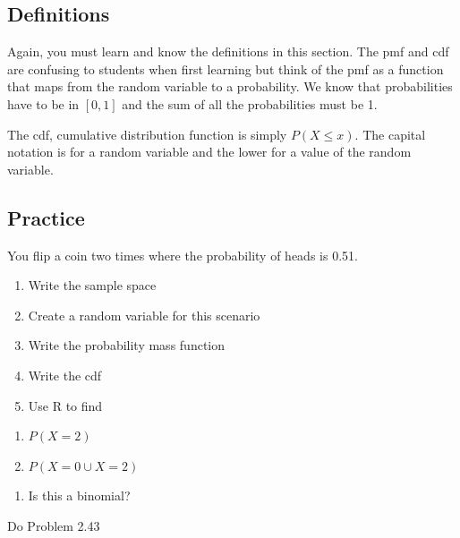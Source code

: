 \documentclass[]{book}
\providecommand{\tightlist}{%
  \setlength{\itemsep}{0pt}\setlength{\parskip}{0pt}}
\theoremstyle{definition}
\theoremstyle{definition}
\theoremstyle{definition}
\theoremstyle{remark}
\begin{document}
\subsection{Definitions}\label{definitions-1}

Again, you must learn and know the definitions in this section. The pmf
and cdf are confusing to students when first learning but think of the
pmf as a function that maps from the random variable to a probability.
We know that probabilities have to be in \([0,1]\) and the sum of all
the probabilities must be 1.

The cdf, cumulative distribution function is simply \(P(X \leq x)\). The
capital notation is for a random variable and the lower for a value of
the random variable.

\subsection{Practice}\label{practice}

You flip a coin two times where the probability of heads is 0.51.

\begin{enumerate}
\def\labelenumi{\arabic{enumi}.}
\tightlist
\item
  Write the sample space\\
\item
  Create a random variable for this scenario\\
\item
  Write the probability mass function
\item
  Write the cdf\\
\item
  Use R to find\\
\end{enumerate}

\begin{enumerate}
\def\labelenumi{\roman{enumi}.}
\tightlist
\item
  \(P(X=2)\)\\
\item
  \(P(X=0 \cup X=2)\)\\
\end{enumerate}

\begin{enumerate}
\def\labelenumi{\arabic{enumi}.}
\setcounter{enumi}{5}
\tightlist
\item
  Is this a binomial?
\end{enumerate}

Do Problem 2.43
\end{document}
